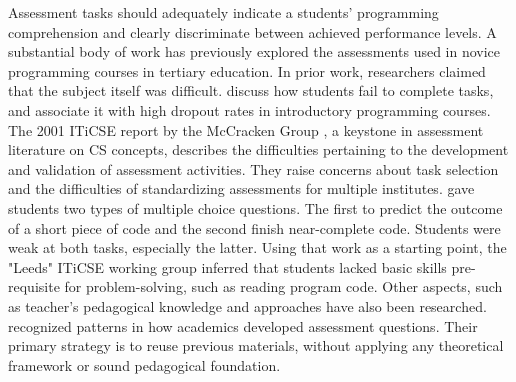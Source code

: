 Assessment tasks should adequately indicate a students’ programming comprehension and clearly discriminate between achieved performance levels.
A substantial body of work has previously explored the assessments used in novice programming courses in tertiary education. In prior work, researchers claimed that the subject itself was difficult.  discuss how students fail to complete tasks, and  associate it with high dropout rates in introductory programming courses. The 2001 ITiCSE report by the McCracken Group \cite{McCracken2001}, a keystone in assessment literature \cite{Giordano2015} on CS concepts, describes the difficulties pertaining to the development and validation of assessment activities. They raise concerns about task selection and the difficulties of standardizing assessments for multiple institutes.   gave students two types of multiple choice questions. The first to predict the outcome of a short piece of code and the second finish near-complete code. Students were weak at both tasks, especially the latter. Using that work as a starting point, the "Leeds" ITiCSE working group inferred that students lacked basic skills pre-requisite for problem-solving, such as reading program code. Other aspects, such as teacher's pedagogical knowledge and approaches have also been researched.  recognized patterns in how academics developed assessment questions. Their primary strategy is to reuse previous materials, without applying any theoretical framework or sound pedagogical foundation.


